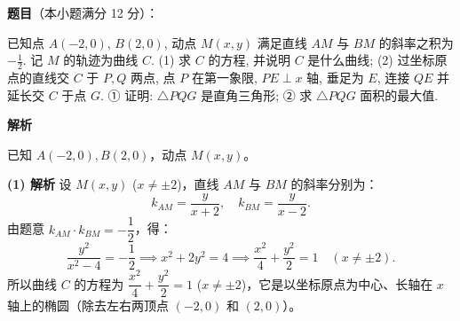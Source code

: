 \begin{answer}

\textbf{题目}（本小题满分 12 分）：

已知点 $A(-2, 0)$, $B(2, 0)$, 动点 $M(x, y)$ 满足直线 $AM$ 与 $BM$ 的斜率之积为 $-\frac{1}{2}$. 记 $M$ 的轨迹为曲线 $C$.
(1) 求 $C$ 的方程, 并说明 $C$ 是什么曲线;
(2) 过坐标原点的直线交 $C$ 于 $P, Q$ 两点, 点 $P$ 在第一象限, $PE \perp x$ 轴, 垂足为 $E$, 连接 $QE$ 并延长交 $C$ 于点 $G$.
① 证明: $\triangle PQG$ 是直角三角形;
② 求 $\triangle PQG$ 面积的最大值.

\textbf{解析}

已知 $A(-2, 0), B(2, 0)$，动点 $M(x, y)$。

\textbf{(1) 解析}
设 $M(x, y)$ ($x \neq \pm 2$)，直线 $AM$ 与 $BM$ 的斜率分别为：
\nopagebreak[4]
\[k_{AM} = \frac{y}{x+2}, \quad k_{BM} = \frac{y}{x-2}.\]
由题意 $k_{AM} \cdot k_{BM} = -\dfrac{1}{2}$，得：
\nopagebreak[4]
\[\frac{y^2}{x^2 - 4} = -\frac{1}{2} \implies x^2 + 2y^2 = 4 \implies \frac{x^2}{4} + \frac{y^2}{2} = 1 \quad (x \neq \pm 2).\]
所以曲线 $C$ 的方程为 $\dfrac{x^2}{4} + \dfrac{y^2}{2} = 1$ ($x \neq \pm 2$)，它是以坐标原点为中心、长轴在 $x$ 轴上的椭圆（除去左右两顶点 $(-2, 0)$ 和 $(2, 0)$）。


\end{answer}
